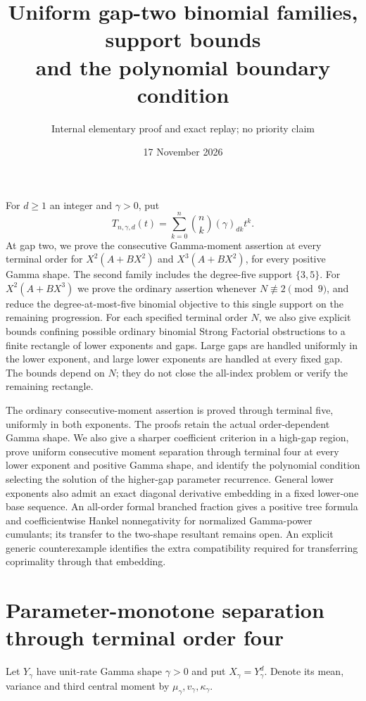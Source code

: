\documentclass[11pt]{article}
\title{Uniform gap-two binomial families, support bounds\\and the polynomial boundary condition}
\author{Internal elementary proof and exact replay; no priority claim}
\date{17 November 2026}
\begin{document}
\maketitle
For $d\ge1$ an integer and $\gamma>0$, put
\[
 T_{n,\gamma,d}(t)=\sum_{k=0}^n\binom nk(\gamma)_{dk}t^k.
\]
At gap two, we prove the consecutive Gamma-moment assertion at every
terminal order for $X^2(A+BX^2)$ and $X^3(A+BX^2)$, for every positive
Gamma shape. The second family includes the degree-five support
$\{3,5\}$. For $X^2(A+BX^3)$ we prove the ordinary assertion whenever
$N\not\equiv2\pmod9$, and reduce the degree-at-most-five binomial
objective to this single support on the remaining progression.
For each specified terminal order $N$, we also give explicit
bounds confining possible ordinary binomial Strong Factorial
obstructions to a finite rectangle of lower exponents and gaps. Large gaps are handled uniformly
in the lower exponent, and large lower exponents are handled at every
fixed gap. The bounds depend on $N$; they do not close the all-index
problem or verify the remaining rectangle.

The ordinary consecutive-moment assertion is proved through terminal five, uniformly in both exponents. The proofs retain the actual order-dependent Gamma shape. We also give
a sharper coefficient criterion in a high-gap region, prove uniform
consecutive moment separation through terminal four at every lower exponent and positive
Gamma shape, and identify the polynomial condition selecting the
solution of the higher-gap parameter recurrence. General lower exponents
also admit an exact diagonal derivative embedding in a fixed lower-one
base sequence. An all-order formal branched fraction gives a positive tree
formula and coefficientwise Hankel nonnegativity for normalized
Gamma-power cumulants; its transfer to the two-shape resultant remains open.
An explicit generic counterexample identifies the extra
compatibility required for transferring coprimality through that embedding.

\section{Parameter-monotone separation through terminal order four}
Let $Y_\gamma$ have unit-rate Gamma shape $\gamma>0$ and put
$X_\gamma=Y_\gamma^d$. Denote its mean, variance and third central
moment by $\mu_\gamma,v_\gamma,\kappa_\gamma$.
\end{document}
